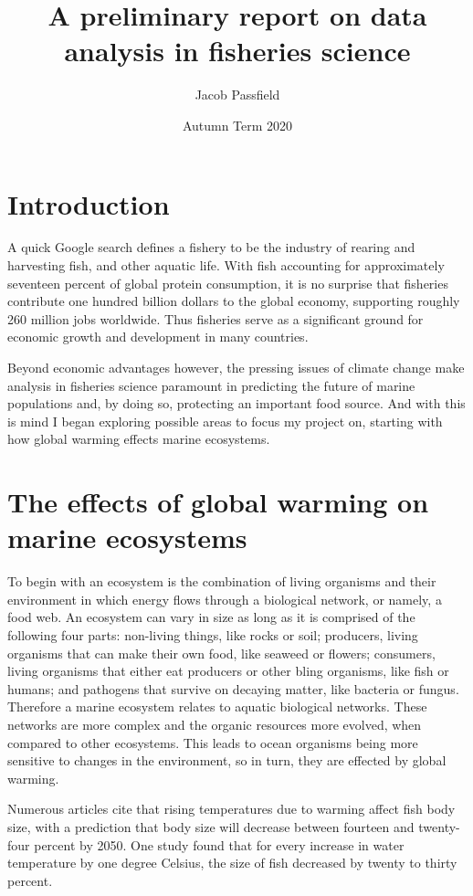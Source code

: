 \documentclass{article}
\title{\huge{\bf{A preliminary report on data analysis in fisheries science}}}
\author{Jacob Passfield}
\date{Autumn Term 2020}
\begin{document}
\maketitle

\section{Introduction}

A quick Google search defines a fishery to be the industry of rearing and harvesting fish, and other aquatic life. With fish accounting for approximately seventeen percent of global protein consumption, it is no surprise that fisheries contribute one hundred billion dollars to the global economy, supporting roughly 260 million jobs worldwide. Thus fisheries serve as a significant ground for economic growth and development in many countries. 

Beyond economic advantages however, the pressing issues of climate change make analysis in fisheries science paramount in predicting the future of marine populations and, by doing so, protecting an important food source. And with this is mind I began exploring possible areas to focus my project on, starting with how global warming effects marine ecosystems.

\section{The effects of global warming on marine ecosystems}

To begin with an ecosystem is the combination of living organisms and their environment in which energy flows through a biological network, or namely, a food web. An ecosystem can vary in size as long as it is comprised of the following four parts: non-living things, like rocks or soil; producers, living organisms that can make their own food, like seaweed or flowers; consumers, living organisms that either eat producers or other bling organisms, like fish or humans; and pathogens that survive on decaying matter, like bacteria or fungus. Therefore a marine ecosystem relates to aquatic biological networks. These networks are more complex and the organic resources more evolved, when compared to other ecosystems. This leads to ocean organisms being more sensitive to changes in the environment, so in turn, they are effected by global warming. 

Numerous articles cite that rising temperatures due to warming affect fish body size, with a prediction that body size will decrease between fourteen and twenty-four percent by 2050. One study found that for every increase in water temperature by one degree Celsius, the size of fish decreased by twenty to thirty percent. 
\end{document}
